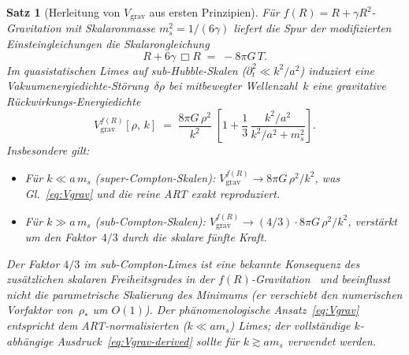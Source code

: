 \documentclass[12pt,a4paper]{article}
\theoremstyle{definition}
\theoremstyle{plain}
\newtheorem{proposition}[definition]{Satz}
\theoremstyle{remark}
\begin{document}
\begin{proposition}[Herleitung von $V_{\mathrm{grav}}$ aus ersten Prinzipien]
\label{prop:Vgrav-from-fR}
F\"ur $f(R) = R + \gamma R^2$-Gravitation mit Skalaronmasse
$m_s^2 = 1/(6\gamma)$ liefert die Spur der modifizierten
Einsteingleichungen die Skalarongleichung
\begin{equation}\label{eq:trace-eqn}
  R + 6\gamma\,\Box R \;=\; -8\pi G\,T.
\end{equation}
Im quasistatischen Limes auf sub-Hubble-Skalen ($\partial_t^2 \ll k^2/a^2$)
induziert eine Vakuumenergiedichte-St\"orung~$\delta\rho$ bei mitbewegter
Wellenzahl~$k$ eine gravitative R\"uckwirkungs-Energiedichte
\begin{equation}\label{eq:Vgrav-derived}
  V_{\mathrm{grav}}^{f(R)}[\rho,\,k]
  \;=\;
  \frac{8\pi G\,\rho^2}{k^2}
  \;\left[1 + \frac{1}{3}\,
  \frac{k^{2}/a^{2}}{k^{2}/a^{2} + m_{s}^{2}}\right].
\end{equation}
Insbesondere gilt:
\begin{itemize}
  \item F\"ur $k \ll a\,m_s$ (super-Compton-Skalen):
    $V_{\mathrm{grav}}^{f(R)} \to 8\pi G\,\rho^2/k^2$, was
    Gl.~\eqref{eq:Vgrav} und die reine ART exakt reproduziert.
  \item F\"ur $k \gg a\,m_s$ (sub-Compton-Skalen):
    $V_{\mathrm{grav}}^{f(R)} \to (4/3)\cdot 8\pi G\,\rho^2/k^2$,
    verst\"arkt um den Faktor~$4/3$ durch die skalare f\"unfte Kraft.
\end{itemize}
Der Faktor $4/3$ im sub-Compton-Limes ist eine bekannte Konsequenz des
zus\"atzlichen skalaren Freiheitsgrades in der $f(R)$-Gravitation~\cite{HuSawicki2007}
und beeinflusst nicht die parametrische Skalierung des Minimums (er verschiebt
den numerischen Vorfaktor von~$\rho_\ast$ um $O(1)$). Der
ph\"anomenologische Ansatz~\eqref{eq:Vgrav} entspricht dem
ART-normalisierten ($k \ll am_s$) Limes; der vollst\"andige
$k$-abh\"angige Ausdruck~\eqref{eq:Vgrav-derived} sollte f\"ur
$k \gtrsim am_s$ verwendet werden.
\end{proposition}
\end{document}

